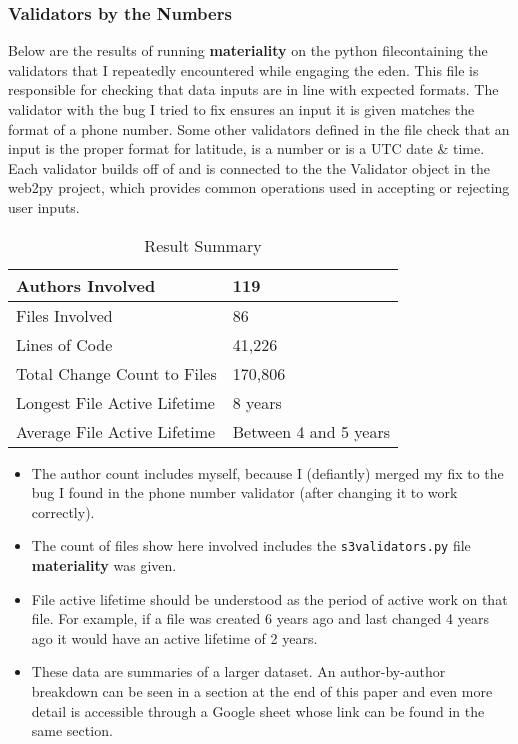 \documentclass[a4paper,man,natbib,floatsintext]{apa6}
\begin{document}
  \subsubsection{Validators by the Numbers}
  Below are the results of running \textbf{materiality} on the \Gls{python} file\footnotemark containing the validators that I repeatedly encountered while engaging the \acrshort{eden}. This file is responsible for checking that data inputs are in line with expected formats. The validator with the bug I tried to fix ensures an input it is given matches the format of a phone number. Some other validators defined in the file check that an input is the proper format for latitude, is a number or is a UTC date \& time. Each validator builds off of and is connected to the the Validator object in the web2py project, which provides common operations used in accepting or rejecting user inputs.


  \begin{table}[ht]
  \caption{Result Summary}
  \label{tab:result-summary}
  \begin{tabular}{|l|l|}
  \hline
  Authors Involved               & 119                                   \\ \hline
  Files Involved                 & 86                                    \\ \hline
  Lines of Code                  & 41,226                                \\ \hline
  Total Change Count to Files    & 170,806                               \\ \hline
  Longest File Active Lifetime   & 8 years                               \\ \hline
  Average File Active Lifetime   & Between 4 and 5 years                 \\ \hline
  \end{tabular}
\end{table}
  
  \begin{itemize}
    \item The author count includes myself, because I (defiantly) merged my fix to the bug I found in the phone number validator (after changing it to work correctly).
    \item The count of files show here involved includes the \verb|s3validators.py| file \textbf{materiality} was given. 
    \item File active lifetime should be understood as the period of active work on that file. For example, if a file was created 6 years ago and last changed 4 years ago it would have an active lifetime of 2 years.
    \item These data are summaries of a larger dataset. An author-by-author breakdown can be seen in a section at the end of this paper and even more detail is accessible through a Google sheet whose link can be found in the same section.
  \end{itemize}
  
\end{document}
